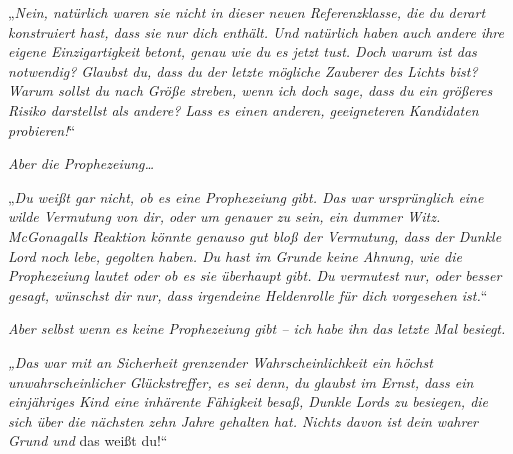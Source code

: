 „\emph{Nein, natürlich waren sie nicht in dieser neuen Referenzklasse, die du derart konstruiert hast, dass sie nur dich enthält. Und natürlich haben auch andere ihre eigene Einzigartigkeit betont, genau wie du es jetzt tust. Doch warum ist das notwendig? Glaubst du, dass du der letzte mögliche Zauberer des Lichts bist? Warum sollst \emph{du} nach Größe streben, wenn ich doch sage, dass du ein größeres Risiko darstellst als andere? Lass es einen anderen, geeigneteren Kandidaten probieren!}“

\emph{Aber die Prophezeiung…}

„\emph{Du weißt gar nicht, ob es eine Prophezeiung gibt. Das war ursprünglich eine wilde Vermutung von dir, oder um genauer zu sein, ein dummer Witz. McGonagalls Reaktion könnte genauso gut bloß der Vermutung, dass der Dunkle Lord noch lebe, gegolten haben. Du hast im Grunde keine Ahnung, wie die Prophezeiung lautet oder ob es sie überhaupt \emph{gibt}. Du vermutest nur, oder besser gesagt, \emph{wünschst} dir nur, dass irgendeine Heldenrolle für dich vorgesehen ist.}“

\emph{Aber selbst wenn es keine Prophezeiung gibt – ich habe ihn das letzte Mal besiegt. }

\emph{„Das war mit an Sicherheit grenzender Wahrscheinlichkeit ein höchst unwahrscheinlicher Glückstreffer, es sei denn, du glaubst im Ernst, dass ein einjähriges Kind eine inhärente Fähigkeit besaß, Dunkle Lords zu besiegen, die sich über die nächsten zehn Jahre gehalten hat. Nichts davon ist dein wahrer Grund und} das weißt du!“

